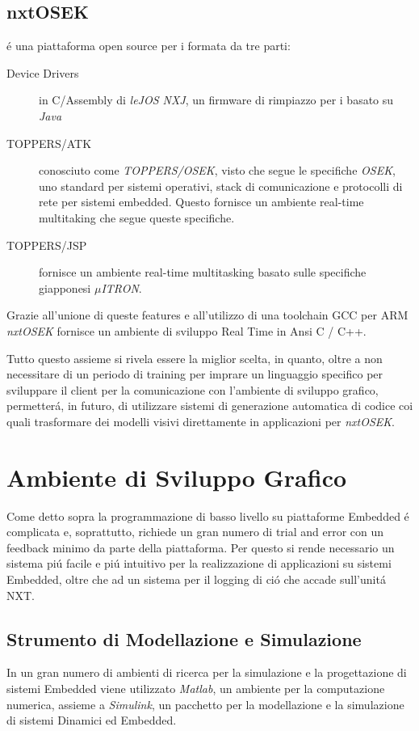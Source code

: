 \subsection{nxtOSEK}
\nxtOSEK{} \'e una piattaforma open source per i \nxt{} formata da tre
parti:
\begin{description}
    \item[Device Drivers]in C/Assembly di \emph{leJOS NXJ}, un firmware di
        rimpiazzo per i \nxt{} basato su \emph{Java}
    \item[TOPPERS/ATK]conosciuto come \emph{TOPPERS/OSEK}, visto che
        segue le specifiche \emph{OSEK}, uno standard per sistemi
        operativi, stack di comunicazione e protocolli di rete per sistemi
        embedded. Questo fornisce un ambiente real-time multitaking che
        segue queste specifiche.
    \item[TOPPERS/JSP]fornisce un ambiente real-time multitasking basato
        sulle specifiche giapponesi \emph{$\mu$ITRON}.
\end{description}
Grazie all'unione di queste features e all'utilizzo di una toolchain GCC
per ARM \emph{nxtOSEK} fornisce un ambiente di sviluppo Real Time in Ansi C
/ C++.

Tutto questo assieme si rivela essere la miglior scelta, in quanto, oltre
a non necessitare di un periodo di training per imprare un linguaggio
specifico per sviluppare il client per la comunicazione con l'ambiente di
sviluppo grafico, permetter\'a, in futuro, di utilizzare sistemi di
generazione automatica di codice coi quali trasformare dei modelli visivi
direttamente in applicazioni per \emph{nxtOSEK}.

\section{Ambiente di Sviluppo Grafico}
Come detto sopra la programmazione di basso livello su piattaforme
Embedded \'e complicata e, soprattutto, richiede un gran numero di trial
and error con un feedback minimo da parte della piattaforma. Per questo si
rende necessario un sistema pi\'u facile e pi\'u intuitivo per la
realizzazione di applicazioni su sistemi Embedded, oltre che ad un sistema
per il logging di ci\'o che accade sull'unit\'a NXT.

\subsection{Strumento di Modellazione e Simulazione}
In un gran numero di ambienti di ricerca per la simulazione e la
progettazione di sistemi Embedded viene utilizzato
\emph{Matlab}, un ambiente per la computazione numerica, assieme a \emph
{Simulink}, un pacchetto per la modellazione e la simulazione di sistemi
Dinamici ed Embedded.

